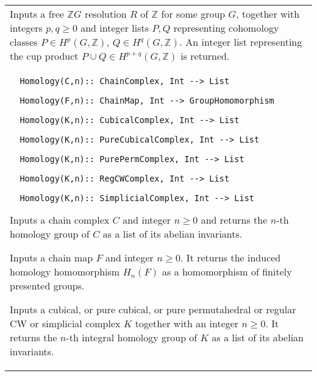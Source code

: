 \documentclass[a4paper,11pt]{report}
\begin{document}
{\begin{center}
\begin{tabular}{|l|}
 Inputs a free $\mathbb ZG$ resolution $R$ of $\mathbb Z$ for some group $G$, together with integers $p,q \ge 0$ and integer lists $P, Q$ representing cohomology classes $P\in H^p(G,\mathbb Z)$, $Q\in H^q(G,\mathbb Z)$. An integer list representing the cup product $P\cup Q \in H^{p+q}(G,\mathbb Z)$ is returned. \\
 \index{Homology} 
\begin{verbatim}  Homology(C,n):: ChainComplex, Int --> List
\end{verbatim}
 
\begin{verbatim}  Homology(F,n):: ChainMap, Int --> GroupHomomorphism
\end{verbatim}
 
\begin{verbatim}  Homology(K,n):: CubicalComplex, Int --> List
\end{verbatim}
 
\begin{verbatim}  Homology(K,n):: PureCubicalComplex, Int --> List
\end{verbatim}
 
\begin{verbatim}  Homology(K,n):: PurePermComplex, Int --> List
\end{verbatim}
 
\begin{verbatim}  Homology(K,n):: RegCWComplex, Int --> List
\end{verbatim}
 
\begin{verbatim}  Homology(K,n):: SimplicialComplex, Int --> List
\end{verbatim}


 

 Inputs a chain complex $C$ and integer $n \ge 0$ and returns the $n$-th homology group of $C$ as a list of its abelian invariants. 

 Inputs a chain map $F$ and integer $n \ge 0$. It returns the induced homology homomorphism $H_n(F)$ as a homomorphism of finitely presented groups. 

 Inputs a cubical, or pure cubical, or pure permutahedral or regular CW or
simplicial complex $K$ together with an integer $n \ge 0$. It returns the $n$-th integral homology group of $K$ as a list of its abelian invariants. \\
\end{tabular}\\[2mm]
\end{center}

}
\end{document}
